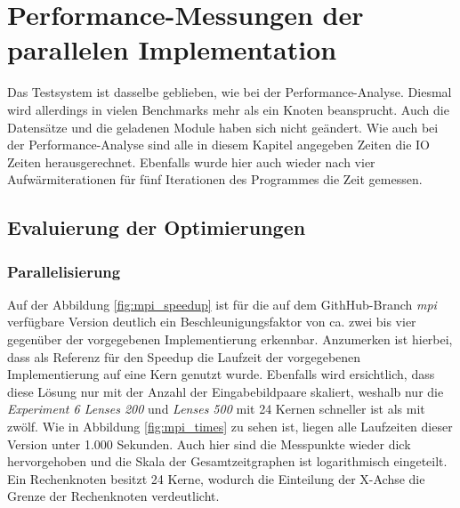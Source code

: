 \chapter{Performance-Messungen der parallelen Implementation}

Das Testsystem ist dasselbe geblieben, wie bei der Performance-Analyse. Diesmal wird allerdings in vielen Benchmarks mehr als ein Knoten beansprucht. Auch die Datensätze und die geladenen Module haben sich nicht geändert. Wie auch bei der Performance-Analyse sind alle in diesem Kapitel angegeben Zeiten die \gls{IO} Zeiten herausgerechnet. Ebenfalls wurde hier auch wieder nach vier Aufwärmiterationen für fünf Iterationen des Programmes die Zeit gemessen. 

\section{Evaluierung der Optimierungen}

\subsection{Parallelisierung}

Auf der Abbildung \ref{fig:mpi_speedup} \cite{Coj17} ist für die auf dem GithHub-Branch \textit{mpi} verfügbare Version deutlich ein Beschleunigungsfaktor von ca. zwei bis vier gegenüber der vorgegebenen Implementierung erkennbar. Anzumerken ist hierbei, dass als Referenz für den Speedup die Laufzeit der vorgegebenen Implementierung auf eine Kern genutzt wurde. Ebenfalls wird ersichtlich, dass diese Lösung nur mit der Anzahl der Eingabebildpaare skaliert, weshalb nur die \textit{Experiment 6 Lenses 200} und \textit{Lenses 500} mit 24 Kernen schneller ist als mit zwölf. Wie in Abbildung \ref{fig:mpi_times} zu sehen ist, liegen alle Laufzeiten dieser Version unter 1.000 Sekunden. Auch hier sind die Messpunkte wieder dick hervorgehoben und die Skala der Gesamtzeitgraphen ist logarithmisch eingeteilt. Ein Rechenknoten besitzt 24 Kerne, wodurch die Einteilung der X-Achse die Grenze der Rechenknoten verdeutlicht. 

